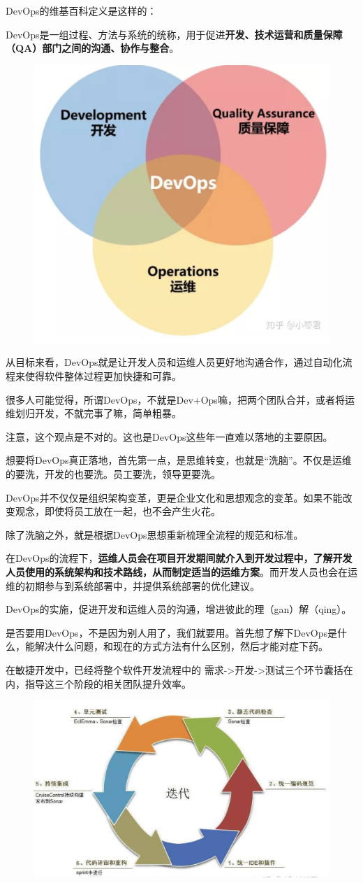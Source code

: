 \documentclass[12pt]{article}
\begin{document}
DevOps的维基百科定义是这样的：

DevOps是一组过程、方法与系统的统称，用于促进\textbf{开发、技术运营和质量保障（QA）部门之间的沟通、协作与整合}。

\begin{figure}[H]
    \centering
    \includegraphics[width=.4\textwidth]{fig/DevOps_Dev_QA_Op.png}
\end{figure}

从目标来看，DevOps就是让开发人员和运维人员更好地沟通合作，通过自动化流程来使得软件整体过程更加快捷和可靠。

\begin{framed}
很多人可能觉得，所谓DevOps，不就是Dev+Ops嘛，把两个团队合并，或者将运维划归开发，不就完事了嘛，简单粗暴。

注意，这个观点是不对的。这也是DevOps这些年一直难以落地的主要原因。

想要将DevOps真正落地，首先第一点，是思维转变，也就是“洗脑”。不仅是运维的要洗，开发的也要洗。员工要洗，领导更要洗。

DevOps并不仅仅是组织架构变革，更是企业文化和思想观念的变革。如果不能改变观念，即使将员工放在一起，也不会产生火花。

除了洗脑之外，就是根据DevOps思想重新梳理全流程的规范和标准。

在DevOps的流程下，\textbf{运维人员会在项目开发期间就介入到开发过程中，了解开发人员使用的系统架构和技术路线，从而制定适当的运维方案}。而开发人员也会在运维的初期参与到系统部署中，并提供系统部署的优化建议。

DevOps的实施，促进开发和运维人员的沟通，增进彼此的理（gan）解（qing）。
\end{framed}

是否要用DevOps，不是因为别人用了，我们就要用。首先想了解下DevOps是什么，能解决什么问题，和现在的方式方法有什么区别，然后才能对症下药。

在敏捷开发中，已经将整个软件开发流程中的 需求->开发->测试三个环节囊括在内，指导这三个阶段的相关团队提升效率。

\begin{figure}[H]
    \centering
    \includegraphics[width=.6\textwidth]{fig/DevOps_Lean.png}
\end{figure}
\end{document}
